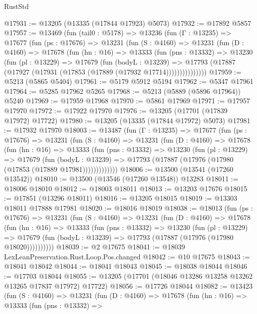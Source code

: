 \begin{lexlean}{RustStd}
\begin{coremodule}
@17931 := @13205 (@13335 (@17844 @17923) @5073)
@17932 := @17892 @5857
@17957 := @13469
    (fun (tail0 : @5178) =>
    @13236
      (fun (Γ : @13235) =>
      @17677
        (fun (ps : @17676) =>
        @13231
          (fun (S : @4160) =>
          @13231
            (fun (D : @4160) =>
            @17678
              (fun (hn : @16) =>
              @13333
                (fun (pns : @13332) =>
                @13230
                  (fun (pl : @13229) =>
                  @17679
                    (fun (bodyL : @13239) =>
                    @17793 (@17887 (@17927 (@17931 (@17853 (@17889 (@17932 @17714)))))))))))))))
@17959 := @5213 (@5865 @5404)
@17961 := @5179 @5912 @5194
@17962 := @5347 @17961
@17964 := @5285 @17962 @5265
@17968 := @5213 (@5889 (@5896 @17964)) @5240
@17969 := @17959 @17968
@17970 := @5861 @17969
@17971 := @17957 @17970
@17972 := @17922 @17970
@17976 := @13205 (@17701 (@17839 @17972) @17722)
@17980 := @13205 (@13335 (@17844 @17972) @5073)
@17981 := @17932 @17970
@18003 := @13487
    (fun (Γ : @13235) =>
    @17677
      (fun (ps : @17676) =>
      @13231
        (fun (S : @4160) =>
        @13231
          (fun (D : @4160) =>
          @17678
            (fun (hn : @16) =>
            @13333
              (fun (pns : @13332) =>
              @13230
                (fun (pl : @13229) =>
                @17679
                  (fun (bodyL : @13239) =>
                  @17793 (@17887 (@17976 (@17980 (@17853 (@17889 @17981)))))))))))))
@18006 := @13500 (@13541 (@17260 @13542))
@18010 := @13500 (@13546 (@17260 @13548)) @13283
@18011 := @18006 @18010
@18012 := @18003 @18011
@18013 := @13203 @17676
@18015 := @17851 (@13296 @18011)
@18016 := @13205 @18015
@18019 := @13303 @18011 @17888 @17981
@18020 := @18016 @18019
@18038 := @18013
    (fun (ps : @17676) =>
    @13231
      (fun (S : @4160) =>
      @13231
        (fun (D : @4160) =>
        @17678
          (fun (hn : @16) =>
          @13333
            (fun (pns : @13332) =>
            @13230
              (fun (pl : @13229) =>
              @17679 (fun (bodyL : @13239) => @17793 (@17887 (@17976 (@17980 @18020))))))))))
@18039 := @2 @17675
@18041 := @18039 LexLeanPreservation.Rust.Loop.Pos.changed
@18042 := @10 @17675
@18043 := @18041 @18042
@18044 := @18041 @18043
@18045 := @18038 @18044
@18046 := @17703 @18044
@18055 := @13205 (@17701 (@18046 @13286 @13258 @13262 @13265 @17837 @17972) @17722)
@18056 := @17726 @18044
@18082 := @13423
    (fun (S : @4160) =>
    @13231
      (fun (D : @4160) =>
      @17678
        (fun (hn : @16) =>
        @13333
          (fun (pns : @13332) =>

\end{coremodule}
\end{lexlean}
